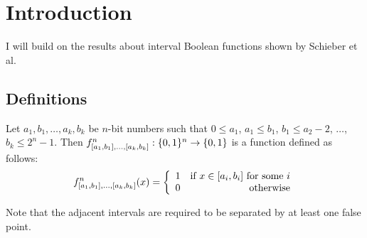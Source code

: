 \chapter*{Introduction}

I will build on the results about interval Boolean functions
shown by Schieber et al.\cite{Schieber2005154}

\section{Definitions}

\begin{definition}
\label{def:kibf}
Let $a_1, b_1, \ldots, a_k, b_k$ be $n$-bit numbers
such that $0 \leq a_1$,
$a_1 \leq b_1$,
$b_1 \leq a_2 - 2$,
$\ldots$,
$b_k \leq 2^n - 1$.
Then $f^n_{[a_1, b_1], \ldots, [a_k, b_k]}: \{0, 1\}{}^n \rightarrow \{0, 1\}{}$ is a function defined as follows:
\[f^n_{\interval{a_1}{b_1}, \ldots, \interval{a_k}{b_k}} (x) = \left\{
  \begin{array}{lr}
    1 & $if $ x \in \interval{a_i}{b_i}$ for some $i\\
    0 & $otherwise$
  \end{array}
\right.
\]
\end{definition}
Note that the adjacent intervals
are required to be separated by at least one false point.


